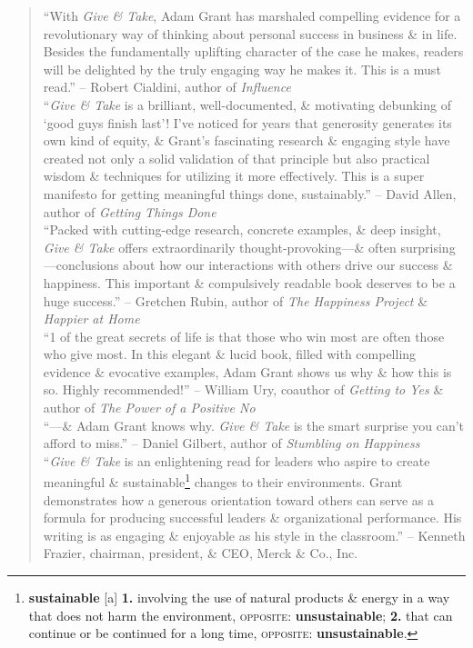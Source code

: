 \documentclass[oneside]{book}
\numberwithin{equation}{section}
\begin{document}
\begin{quotation}
	``With \textit{Give \& Take}, Adam Grant has marshaled compelling evidence for a revolutionary way of thinking about personal success in business \& in life. Besides the fundamentally uplifting character of the case he makes, readers will be delighted by the truly engaging way he makes it. This is a must read.'' -- Robert Cialdini, author of \textit{Influence}\\
	
	``\textit{Give \& Take} is a brilliant, well-documented, \& motivating debunking of `good guys finish last'! I've noticed for years that generosity generates its own kind of equity, \& Grant's fascinating research \& engaging style have created not only a solid validation of that principle but also practical wisdom \& techniques for utilizing it more effectively. This is a super manifesto for getting meaningful things done, sustainably.'' -- David Allen, author of \textit{Getting Things Done}\\
	
	``Packed with cutting-edge research, concrete examples, \& deep insight, \textit{Give \& Take} offers extraordinarily thought-provoking---\& often surprising---conclusions about how our interactions with others drive our success \& happiness. This important \& compulsively readable book deserves to be a huge success.'' -- Gretchen Rubin, author of \textit{The Happiness Project} \& \textit{Happier at Home}\\
	
	``1 of the great secrets of life is that those who win most are often those who give most. In this elegant \& lucid book, filled with compelling evidence \& evocative examples, Adam Grant shows us why \& how this is so. Highly recommended!'' -- William Ury, coauthor of \textit{Getting to Yes} \& author of \textit{The Power of a Positive No}\\
	
	``---\& Adam Grant knows why. \textit{Give \& Take} is the smart surprise you can't afford to miss.'' -- Daniel Gilbert, author of \textit{Stumbling on Happiness}\\
	
	``\textit{Give \& Take} is an enlightening read for leaders who aspire to create meaningful \& sustainable\footnote{\textbf{sustainable} [a] \textbf{1.} involving the use of natural products \& energy in a way that does not harm the environment, \textsc{opposite}: \textbf{unsustainable}; \textbf{2.} that can continue or be continued for a long time, \textsc{opposite}: \textbf{unsustainable}.} changes to their environments. Grant demonstrates how a generous orientation toward others can serve as a formula for producing successful leaders \& organizational performance. His writing is as engaging \& enjoyable as his style in the classroom.'' -- Kenneth Frazier, chairman, president, \& CEO, Merck \& Co., Inc.\\
	

\end{quotation}
\end{document}
